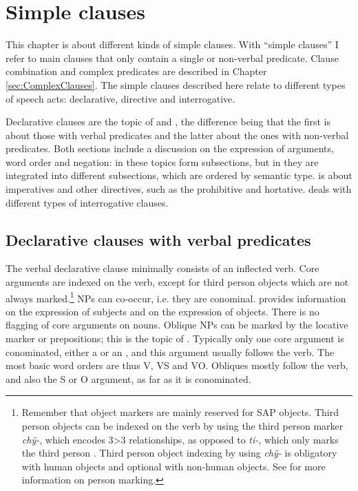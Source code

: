 
\chapter{Simple clauses}\label{chap:SimpleClauses}

This chapter is about different kinds of simple clauses. With “simple clauses” I refer to main clauses that only contain a single  or non-verbal predicate. Clause combination and complex predicates are described in Chapter \ref{sec:ComplexClauses}. The simple clauses described here relate to different types of speech acts: declarative, directive and interrogative. 

Declarative clauses are the topic of  and , the difference being that the first is about those with verbal predicates and the latter about the ones with non-verbal predicates. Both sections include a discussion on the expression of arguments, word order and negation: in  these topics form subsections, but in  they are integrated into different subsections, which are ordered by semantic type.  is about imperatives and other directives, such as the prohibitive and hortative.  deals with different types of interrogative clauses.

\section{Declarative clauses with verbal predicates}\label{sec:SimpleClauses}

The verbal declarative clause minimally consists of an inflected verb. Core arguments are indexed on the verb, except for third person objects which are not always marked.\footnote{Remember that object markers are mainly reserved for SAP objects. Third person objects can be indexed on the verb by using the third person marker \textit{chÿ-}, which encodes 3>3 relationships, as opposed to \textit{ti-}, which only marks the third person . Third person object indexing by using \textit{chÿ-} is obligatory with human objects and optional with non-human objects. See  for more information on person marking.} NPs can co-occur, i.e. they are conominal.  provides information on the expression of subjects and  on the expression of objects. There is no flagging of core arguments on nouns. Oblique NPs can be marked by the locative marker or prepositions; this is the topic of . Typically only one core argument is conominated, either a  or an , and this argument usually follows the verb. The most basic word orders are thus V, VS and VO. Obliques mostly follow the verb, and also the S or O argument, as far as it is conominated.

